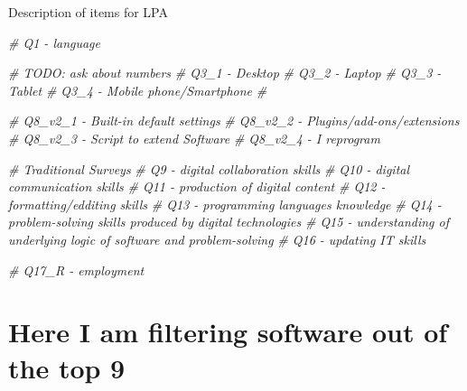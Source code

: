 \documentclass[]{article}
\newenvironment{Shaded}{\begin{snugshade}}{\end{snugshade}}
\newcommand{\KeywordTok}[1]{\textcolor[rgb]{0.13,0.29,0.53}{\textbf{{#1}}}}
\newcommand{\DataTypeTok}[1]{\textcolor[rgb]{0.13,0.29,0.53}{{#1}}}
\newcommand{\DecValTok}[1]{\textcolor[rgb]{0.00,0.00,0.81}{{#1}}}
\newcommand{\StringTok}[1]{\textcolor[rgb]{0.31,0.60,0.02}{{#1}}}
\newcommand{\CommentTok}[1]{\textcolor[rgb]{0.56,0.35,0.01}{\textit{{#1}}}}
\newcommand{\NormalTok}[1]{{#1}}
\begin{document}
Description of items for LPA

\begin{Shaded}
\begin{Highlighting}[]
\CommentTok{# Q1 - language}

\CommentTok{# TODO: ask about numbers}
\CommentTok{# Q3_1 - Desktop}
\CommentTok{# Q3_2 - Laptop}
\CommentTok{# Q3_3 - Tablet}
\CommentTok{# Q3_4 - Mobile phone/Smartphone}
\CommentTok{#}

\CommentTok{# Q8_v2_1 - Built-in default settings}
\CommentTok{# Q8_v2_2 - Plugins/add-ons/extensions}
\CommentTok{# Q8_v2_3 - Script to extend Software}
\CommentTok{# Q8_v2_4 - I reprogram}

\CommentTok{# Traditional Surveys}
\CommentTok{# Q9 - digital collaboration skills}
\CommentTok{# Q10 - digital communication skills}
\CommentTok{# Q11 - production of digital content}
\CommentTok{# Q12 - formatting/edditing skills}
\CommentTok{# Q13 - programming languages knowledge}
\CommentTok{# Q14 - problem-solving skills produced by digital technologies}
\CommentTok{# Q15 - understanding of underlying logic of software and problem-solving}
\CommentTok{# Q16 - updating IT skills}


\CommentTok{# Q17_R - employment }
\end{Highlighting}
\end{Shaded}

\section{Here I am filtering software out of the top
9}\label{here-i-am-filtering-software-out-of-the-top-9}

\begin{Shaded}
\end{Shaded}
\end{document}
